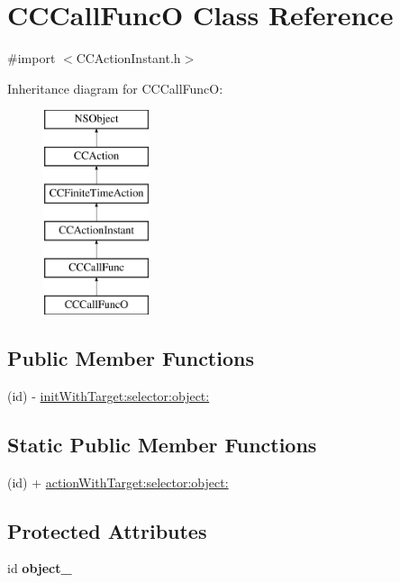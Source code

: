 \hypertarget{interface_c_c_call_func_o}{\section{C\-C\-Call\-Func\-O Class Reference}
\label{interface_c_c_call_func_o}
}


{\ttfamily \#import $<$C\-C\-Action\-Instant.\-h$>$}

Inheritance diagram for C\-C\-Call\-Func\-O\-:\begin{figure}[H]
\begin{center}
\leavevmode
\includegraphics[height=6.000000cm]{interface_c_c_call_func_o}
\end{center}
\end{figure}
\subsection*{Public Member Functions}
\begin{DoxyCompactItemize}
\item 
(id) -\/ \hyperlink{interface_c_c_call_func_o_a449da6db7ef0d52e2fa5794a8276f85b}{init\-With\-Target\-:selector\-:object\-:}
\end{DoxyCompactItemize}
\subsection*{Static Public Member Functions}
\begin{DoxyCompactItemize}
\item 
(id) + \hyperlink{interface_c_c_call_func_o_a2444389a377c5baf05bec11db16badb6}{action\-With\-Target\-:selector\-:object\-:}
\end{DoxyCompactItemize}
\subsection*{Protected Attributes}
\begin{DoxyCompactItemize}
\item 
\hypertarget{interface_c_c_call_func_o_a5ed49e2b56d9dae47dbbf151f7e02192}{id {\bfseries object\-\_\-}}\label{interface_c_c_call_func_o_a5ed49e2b56d9dae47dbbf151f7e02192}

\end{DoxyCompactItemize}
